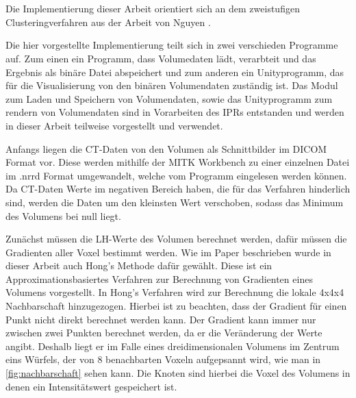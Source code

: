 \chapter{}
\label{sec:methods}


Die Implementierung dieser Arbeit orientiert sich an dem zweistufigen Clusteringverfahren aus der Arbeit von Nguyen \cite{nguyen2012clustering}.
 
Die hier vorgestellte Implementierung teilt sich in zwei verschieden Programme auf. Zum einen ein Programm, dass Volumedaten lädt, verarbteit und das Ergebnis als binäre Datei abspeichert und zum anderen ein Unityprogramm, das für die Visualisierung von den binären Volumendaten zuständig ist. 
Das Modul zum Laden und Speichern von Volumendaten, sowie das Unityprogramm zum rendern von Volumendaten sind in Vorarbeiten des IPRs entstanden und  werden in dieser Arbeit teilweise vorgestellt und verwendet. 

Anfangs liegen die CT-Daten von den Volumen als Schnittbilder im DICOM Format vor. Diese werden mithilfe der MITK Workbench zu einer einzelnen Datei im .nrrd Format umgewandelt, welche vom Programm eingelesen werden können.
Da CT-Daten Werte im negativen Bereich haben, die für  das Verfahren hinderlich sind, werden die Daten um den kleinsten Wert verschoben, sodass das Minimum des Volumens bei null liegt.


Zunächst müssen die LH-Werte des Volumen berechnet werden, dafür müssen die Gradienten aller Voxel bestimmt werden. Wie im Paper beschrieben wurde in dieser Arbeit auch Hong's Methode \cite{hong2003method} dafür gewählt.
Diese ist ein Approximationsbasiertes Verfahren zur Berechnung von Gradienten eines Volumens vorgestellt. 
\newline
 In Hong's Verfahren wird zur Berechnung die lokale 4x4x4 Nachbarschaft hinzugezogen. Hierbei ist zu beachten, dass der Gradient für einen Punkt nicht direkt berechnet werden kann. Der Gradient kann immer nur zwischen zwei Punkten berechnet werden, da er die Veränderung der Werte angibt. Deshalb liegt er im Falle eines dreidimensionalen Volumens im Zentrum eins Würfels, der von 8 benachbarten Voxeln aufgepsannt wird, wie man in \autoref{fig:nachbarschaft} sehen kann. Die Knoten sind hierbei die Voxel des Volumens in denen ein Intensitätswert gespeichert ist.
\newline

